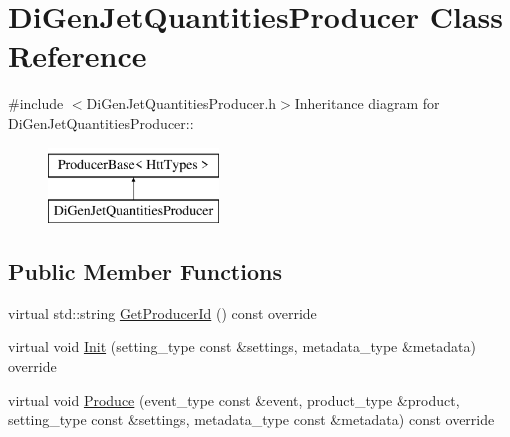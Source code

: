 \hypertarget{classDiGenJetQuantitiesProducer}{
\section{DiGenJetQuantitiesProducer Class Reference}
\label{classDiGenJetQuantitiesProducer}
}


{\ttfamily \#include $<$DiGenJetQuantitiesProducer.h$>$}Inheritance diagram for DiGenJetQuantitiesProducer::\begin{figure}[H]
\begin{center}
\leavevmode
\includegraphics[height=2cm]{classDiGenJetQuantitiesProducer}
\end{center}
\end{figure}
\subsection*{Public Member Functions}
\begin{DoxyCompactItemize}
\item 
virtual std::string \hyperlink{classDiGenJetQuantitiesProducer_a1c194c368d6c1c2d10dc839d0187437c}{GetProducerId} () const override
\item 
virtual void \hyperlink{classDiGenJetQuantitiesProducer_a48099052687ad6a6eefab97bd41ba632}{Init} (setting\_\-type const \&settings, metadata\_\-type \&metadata) override
\item 
virtual void \hyperlink{classDiGenJetQuantitiesProducer_a29e429278cf2b72ebae47f8632b9e32b}{Produce} (event\_\-type const \&event, product\_\-type \&product, setting\_\-type const \&settings, metadata\_\-type const \&metadata) const override
\end{DoxyCompactItemize}


